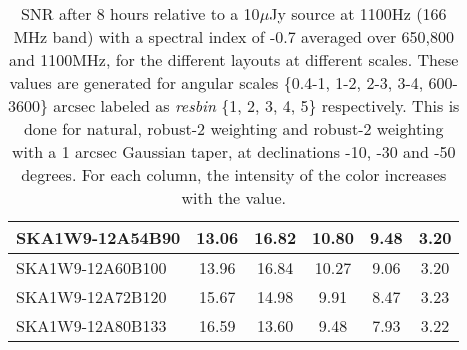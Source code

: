 \begin{table}[H]
{{\begin{tabular}{|lccccc|}
SKA1W9-12A54B90 & 13.06 \cellcolor{blue!18.00} & 16.82 \cellcolor{red!59.87} & 10.80 \cellcolor{green!60.00} & 9.48 \cellcolor{orange!60.00} & 3.20 \cellcolor{purple!18.00}\\ \hline 
SKA1W9-12A60B100 & 13.96 \cellcolor{blue!28.71} & 16.84 \cellcolor{red!60.00} & 10.27 \cellcolor{green!47.56} & 9.06 \cellcolor{orange!48.62} & 3.20 \cellcolor{purple!18.00}\\ \hline 
SKA1W9-12A72B120 & 15.67 \cellcolor{blue!49.05} & 14.98 \cellcolor{red!47.54} & 9.91 \cellcolor{green!39.12} & 8.47 \cellcolor{orange!32.63} & 3.23 \cellcolor{purple!26.40}\\ \hline 
SKA1W9-12A80B133 & 16.59 \cellcolor{blue!60.00} & 13.60 \cellcolor{red!38.30} & 9.48 \cellcolor{green!29.03} & 7.93 \cellcolor{orange!18.00} & 3.22 \cellcolor{purple!23.60}\\ \hline 
\end{tabular}}
\vspace{0.000000cm}
\hspace{1cm} 
\vspace{0.000000cm}
\hspace{1cm} 

\vspace{.50cm}
\caption{SNR after 8 hours relative to a 10$\mu$Jy source at 1100Hz (166 MHz band) with a spectral index of -0.7 averaged over 650,800 and 1100MHz, for the different layouts at different scales. These values are generated for angular scales \{0.4-1, 1-2, 2-3, 3-4, 600-3600\} arcsec labeled as {\it resbin} \{1, 2, 3, 4, 5\} respectively. This is done for natural, robust-2 weighting and robust-2 weighting with a 1 arcsec Gaussian taper, at declinations -10, -30 and -50 degrees. For each column, the intensity of the color increases with the value.}\label{tab:snravg}}
 \end{table}
